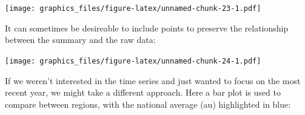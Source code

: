 \documentclass[]{article}
\newenvironment{Shaded}{\begin{snugshade}}{\end{snugshade}}
\newcommand{\KeywordTok}[1]{\textcolor[rgb]{0.13,0.29,0.53}{\textbf{#1}}}
\newcommand{\DataTypeTok}[1]{\textcolor[rgb]{0.13,0.29,0.53}{#1}}
\newcommand{\DecValTok}[1]{\textcolor[rgb]{0.00,0.00,0.81}{#1}}
\newcommand{\StringTok}[1]{\textcolor[rgb]{0.31,0.60,0.02}{#1}}
\newcommand{\OperatorTok}[1]{\textcolor[rgb]{0.81,0.36,0.00}{\textbf{#1}}}
\newcommand{\NormalTok}[1]{#1}
\theoremstyle{definition}
\theoremstyle{definition}
\theoremstyle{definition}
\theoremstyle{remark}
\begin{document}
\texttt{[image: graphics\_files/figure-latex/unnamed-chunk-23-1.pdf]}

It can sometimes be desireable to include points to preserve the
relationship between the summary and the raw data:

\begin{Shaded}
\end{Shaded}

\texttt{[image: graphics\_files/figure-latex/unnamed-chunk-24-1.pdf]}

If we weren't interested in the time series and just wanted to focus on
the most recent year, we might take a different approach. Here a bar
plot is used to compare between regions, with the national average (au)
highlighted in blue:

\begin{Shaded}
\end{Shaded}
\end{document}
